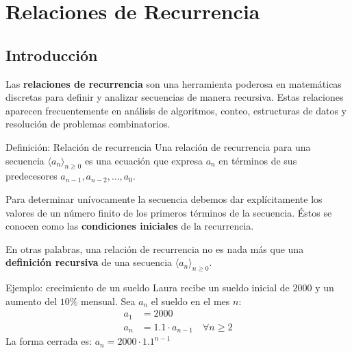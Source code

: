 

\section{Relaciones de Recurrencia }

\subsection{Introducción}

Las \textbf{relaciones de recurrencia} son una herramienta poderosa en matemáticas discretas para definir y analizar secuencias de manera recursiva. Estas relaciones aparecen frecuentemente en análisis de algoritmos, conteo, estructuras de datos y resolución de problemas combinatorios.

\begin{definitionblock}{Definición: Relación de recurrencia}
Una relación de recurrencia para una secuencia $\langle a_n
\rangle_{n \geq 0}$ es una ecuación que expresa $a_n$ en términos de
sus predecesores $a_{n-1}, a_{n-2}, \ldots, a_0$.

\medskip

Para determinar unívocamente la secuencia debemos dar explícitamente
los valores de un número finito de los primeros términos de la
secuencia. Éstos se conocen como las \textbf{condiciones iniciales} de
la recurrencia.
\end{definitionblock}

En otras palabras, una relación de recurrencia no es nada más que una \textbf{definición recursiva} de una secuencia $\langle a_n \rangle_{n \geq 0}$.


\begin{exampleblock}{Ejemplo: crecimiento de un sueldo}
Laura recibe un sueldo inicial de $2000$ y un aumento del $10\%$ mensual. Sea $a_n$ el sueldo en el mes $n$:
\begin{align*}
a_1 &= 2000 \\
a_n &= 1.1 \cdot a_{n-1} \quad \forall n \geq 2
\end{align*}
\noindent La forma cerrada es: $a_n = 2000 \cdot 1.1^{n-1}$
\end{exampleblock}


